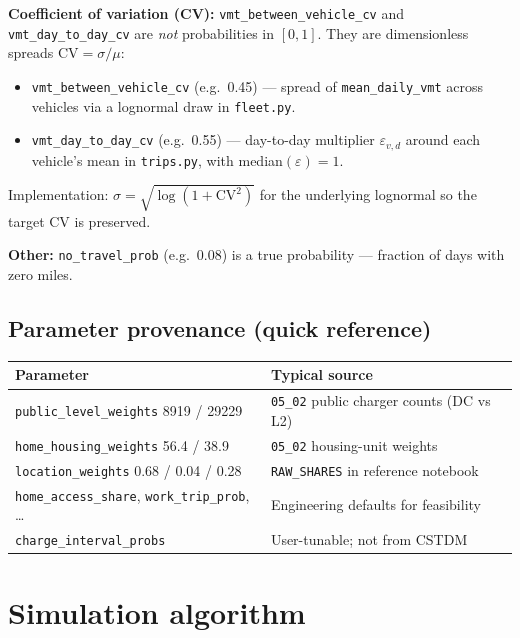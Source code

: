 \documentclass[11pt,a4paper]{article}
\begin{document}
\textbf{Coefficient of variation (CV):} \texttt{vmt\_between\_vehicle\_cv} and \texttt{vmt\_day\_to\_day\_cv} are \emph{not} probabilities in $[0,1]$. They are dimensionless spreads $\mathrm{CV}=\sigma/\mu$:
\begin{itemize}[noitemsep]
  \item \texttt{vmt\_between\_vehicle\_cv} (e.g.\ 0.45) --- spread of \texttt{mean\_daily\_vmt} across vehicles via a lognormal draw in \texttt{fleet.py}.
  \item \texttt{vmt\_day\_to\_day\_cv} (e.g.\ 0.55) --- day-to-day multiplier $\varepsilon_{v,d}$ around each vehicle's mean in \texttt{trips.py}, with median$(\varepsilon)=1$.
\end{itemize}
Implementation: $\sigma=\sqrt{\log(1+\mathrm{CV}^2)}$ for the underlying lognormal so the target CV is preserved.

\textbf{Other:} \texttt{no\_travel\_prob} (e.g.\ 0.08) is a true probability --- fraction of days with zero miles.

\subsection{Parameter provenance (quick reference)}
\begin{center}
\small
\begin{tabular}{ll}
\toprule
Parameter & Typical source \\
\midrule
\texttt{public\_level\_weights} 8919 / 29229 & \texttt{05\_02} public charger counts (DC vs L2) \\
\texttt{home\_housing\_weights} 56.4 / 38.9 & \texttt{05\_02} housing-unit weights \\
\texttt{location\_weights} 0.68 / 0.04 / 0.28 & \texttt{RAW\_SHARES} in reference notebook \\
\texttt{home\_access\_share}, \texttt{work\_trip\_prob}, \ldots & Engineering defaults for feasibility \\
\texttt{charge\_interval\_probs} & User-tunable; not from CSTDM \\
\bottomrule
\end{tabular}
\end{center}

\section{Simulation algorithm}
\end{document}
